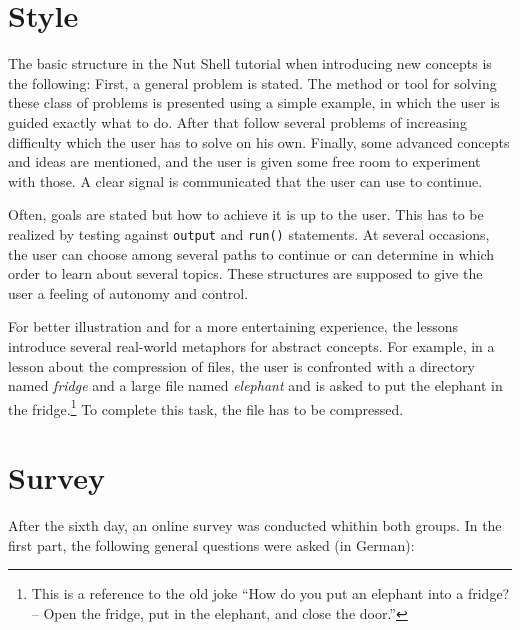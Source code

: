 \documentclass[paper=a4,twoside,abstract=on,cleardoublepage=empty,numbers=noenddot,toc=bib,12pt,appendixprefix=true]{scrreprt}
\begin{document}
\section{Style}

The basic structure in the Nut Shell tutorial when introducing new concepts is the following: First, a general problem is stated. The method or tool for solving these class of problems is presented using a simple example, in which the user is guided exactly what to do. After that follow several problems of increasing difficulty which the user has to solve on his own. Finally, some advanced concepts and ideas are mentioned, and the user is given some free room to experiment with those. A clear signal is communicated that the user can use to continue.

Often, goals are stated but how to achieve it is up to the user. This has to be realized by testing against \texttt{output} and \texttt{run()} statements. At several occasions, the user can choose among several paths to continue or can determine in which order to learn about several topics. These structures are supposed to give the user a feeling of autonomy and control.

For better illustration and for a more entertaining experience, the lessons introduce several real-world metaphors for abstract concepts. For example, in a lesson about the compression of files, the user is confronted with a directory named \textit{fridge} and a large file named \textit{elephant} and is asked to put the elephant in the fridge.\footnote{This is a reference to the old joke “How do you put an elephant into a fridge? -- Open the fridge, put in the elephant, and close the door.”} To complete this task, the file has to be compressed.

\section{Survey}

After the sixth day, an online survey was conducted whithin both groups. In the first part, the following general questions were asked (in German):
\end{document}
